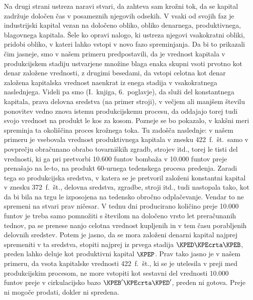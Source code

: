 \documentclass[kapital_02.tex]{subfiles}
\begin{document}
Na drugi strani ustreza naravi stvari, da zahteva sam krožni tok, da se kapital zadržuje določen čas v posameznih njegovih odsekih. V vsaki od svojih faz je industrijski kapital vezan na določeno obliko, obliko denarnega, produktivnega, blagovnega kapitala. Šele ko opravi nalogo, ki ustreza njegovi vsakokratni obliki, pridobi obliko, v kateri lahko vstopi v novo fazo spreminjanja. Da bi to prikazali čim jasneje, smo v našem primeru predpostavili, da je vrednost kapitala v produkcijskem stadiju ustvarjene množine blaga enaka skupni vsoti prvotno kot denar založene vrednosti, z drugimi besedami, da vstopi celotna kot denar založena kapitalska vrednost naenkrat iz enega stadija v vsakokratnega naslednjega. Videli pa smo (I.\ knjiga, 6.\ poglavje), da služi del konstantnega kapitala, prava delovna sredstva (na primer stroji), v večjem ali manjšem številu ponovitev vedno znova istemu produkcijskemu procesu, da oddajajo torej tudi svojo vrednost na produkt le kos za kosom. Pozneje se bo pokazalo, v kakšni meri spreminja ta okoliščina proces krožnega toka. Tu zadošča naslednje: v našem primeru je vsebovala vrednost produktivnega kapitala v znesku 422\ f.\ št.\ samo v povprečju obračunano obrabo tovarniških zgradb, strojev itd., torej le tisti del vrednosti, ki ga pri pretvorbi 10.600 funtov bombaža v 10.000 funtov preje prenašajo na le-to, na produkt 60-urnega tedenskega procesa predenja. Zaradi tega so produkcijska sredstva, v katera se je pretvoril založeni konstantni kapital v znesku 372\ f.\ št., delovna \KPEstran sredstva, zgradbe, stroji itd., tudi nastopala tako, kot da bi bila na trgu le izposojena na tedensko obročno odplačevanje. Vendar to ne spremeni na stvari prav ničesar. V tednu dni producirano količino preje 10.000 funtov je treba samo pomnožiti s številom na določeno vrsto let preračunanih tednov, pa se prenese nanjo celotna vrednost kupljenih in v tem času porabljenih delovnih sredstev. Potem je jasno, da se mora založeni denarni kapital najprej spremeniti v ta sredstva, stopiti najprej iz prvega stadija \(\KPED\KPEcrta\KPEB\), preden lahko deluje kot produktivni kapital \(\KPEP\). Prav tako jasno je v našem primeru, da vsota kapitalske vrednosti 422\ f.\ št., ki se je utelesila v preji med produkcijskim procesom, ne more vstopiti kot sestavni del vrednosti 10.000 funtov preje v cirkulacijsko bazo \(\KPEB'\KPEcrta\KPED'\), preden ni gotova. Preje ni mogoče prodati, dokler ni spredena.
\end{document}

